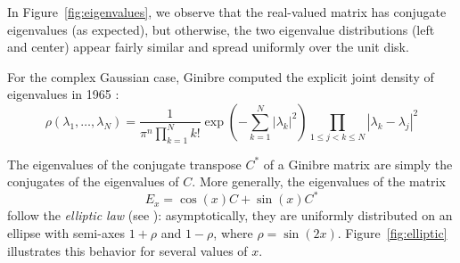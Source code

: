 \documentclass{article}
\begin{document}
	In Figure~\ref{fig:eigenvalues}, we observe that 
	the real-valued matrix has conjugate eigenvalues (as expected),  
	but otherwise, the two eigenvalue distributions (left and center) 
	appear fairly similar and spread uniformly over the unit disk.

	For the complex Gaussian case, Ginibre computed the explicit joint density of eigenvalues in 1965 \cite{Ginibre-1965}:
	$$\rho (\lambda_1, \dots , \lambda_N) = 
	\frac{1}{\pi^n \prod_{k=1}^N k!}
	\exp(-\sum_{k=1}^N |\lambda_{k}|^{2}) 
	\prod_{1\leq j < k \leq N} |\lambda_k - \lambda_j|^2$$

	The eigenvalues of the conjugate transpose $C^*$ of a Ginibre matrix are simply the conjugates of the eigenvalues of $C$.
	More generally, the eigenvalues of the matrix
	\[
	E_x = \cos(x) C + \sin(x) C^*
	\]
	follow the \emph{elliptic law} (see \cite{Naumov-2012,Nguyen-ORourke-2015}):  
	asymptotically, they are uniformly distributed on an ellipse with semi-axes 
	$1+\rho$ and $1-\rho$, where $\rho = \sin(2x)$.  
	Figure~\ref{fig:elliptic} illustrates this behavior for several values of $x$.
\end{document}
